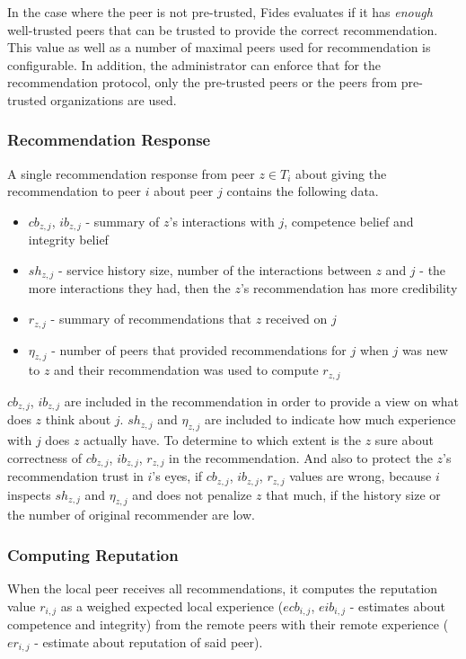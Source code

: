 In the case where the peer is not pre-trusted, Fides evaluates if it has \textit{enough} well-trusted peers that can be trusted to provide the correct recommendation. This value as well as a number of maximal peers used for recommendation is configurable.
In addition, the administrator can enforce that for the recommendation protocol, only the pre-trusted peers or the peers from pre-trusted organizations are used.

\subsubsection{Recommendation Response}
A single recommendation response from peer $z \in T_{i}$ about giving the recommendation to peer $i$ about peer $j$ contains the following data.
\begin{itemize}
    \item $cb_{z,j}$, $ib_{z,j}$ - summary of $z$'s interactions with $j$, competence belief and integrity belief
    \item $sh_{z,j}$ - service history size, number of the interactions between $z$ and $j$ - the more interactions they had, then the $z$'s recommendation has more credibility
    \item $r_{z, j}$ - summary of recommendations that $z$ received on $j$
    \item $\eta_{z,j}$ - number of peers that provided recommendations for $j$ when $j$ was new to $z$ and their recommendation was used to compute $r_{z,j}$
\end{itemize}

$cb_{z,j}$, $ib_{z,j}$ are included in the recommendation in order to provide a view on what does $z$ think about $j$.
$sh_{z,j}$ and $\eta_{z,j}$ are included to indicate how much experience with $j$ does $z$ actually have. To determine to which extent is the $z$ sure about correctness of $cb_{z,j}$, $ib_{z,j}$, $r_{z, j}$ in the recommendation.
And also to protect the $z$'s recommendation trust in $i$'s eyes, if $cb_{z,j}$, $ib_{z,j}$, $r_{z, j}$ values are wrong, because $i$ inspects $sh_{z,j}$ and $\eta_{z,j}$ and does not penalize $z$ that much, if the history size or the number of original recommender are low.

\subsubsection{Computing Reputation}
\label{subsubsec:computing-reputation}
When the local peer receives all recommendations, it computes the reputation value $r_{i,j}$ as a weighed expected local experience ($ecb_{i,j}$, $eib_{i,j}$ - estimates about competence and integrity) from the remote peers with their remote experience ($er_{i,j}$ - estimate about reputation of said peer).


